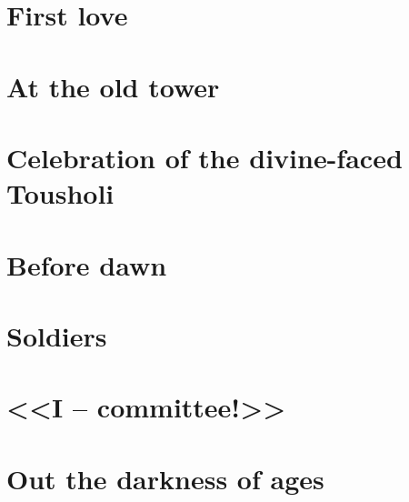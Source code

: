 \documentclass[smalldemyvopaper,11pt,twoside,onecolumn,openright,extrafontsizes]{memoir}
\begin{document}
\chapter{First love}
\chapter{At the old tower}
\chapter{Celebration of the divine-faced Tousholi}
\chapter{Before dawn}
\chapter{Soldiers}
\chapter{<<I -- committee!>>}
\chapter{Out the darkness of ages}

\pagestyle{empty}
\cleardoublepage
\end{document}
